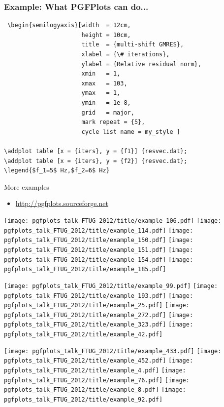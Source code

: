 \documentclass{beamer}
\begin{document}
\begin{frame}[fragile]
\frametitle{Example: What PGFPlots can do...}
\begin{verbatim}
 \begin{semilogyaxis}[width  = 12cm, 
                      height = 10cm,
                      title  = {multi-shift GMRES},
                      xlabel = {\# iterations},
                      ylabel = {Relative residual norm},
                      xmin   = 1,
                      xmax   = 103,
                      ymax   = 1,
                      ymin   = 1e-8,
                      grid   = major,
                      mark repeat = {5},
                      cycle list name = my_style ] 
                     
\addplot table [x = {iters}, y = {f1}] {resvec.dat};
\addplot table [x = {iters}, y = {f2}] {resvec.dat};
\legend{$f_1=5$ Hz,$f_2=6$ Hz} 
\end{verbatim}
\end{frame}

\begin{frame}{More examples}
    \begin{itemize}
        \item \url{http://pgfplots.sourceforge.net}
     \end{itemize}
 \texttt{[image: pgfplots\_talk\_FTUG\_2012/title/example\_106.pdf]} 
 \texttt{[image: pgfplots\_talk\_FTUG\_2012/title/example\_114.pdf]} 
 \texttt{[image: pgfplots\_talk\_FTUG\_2012/title/example\_150.pdf]} 
 \texttt{[image: pgfplots\_talk\_FTUG\_2012/title/example\_151.pdf]} 
 \texttt{[image: pgfplots\_talk\_FTUG\_2012/title/example\_154.pdf]} 
 \texttt{[image: pgfplots\_talk\_FTUG\_2012/title/example\_185.pdf]}

 \texttt{[image: pgfplots\_talk\_FTUG\_2012/title/example\_99.pdf]}
 \texttt{[image: pgfplots\_talk\_FTUG\_2012/title/example\_193.pdf]} 
 \texttt{[image: pgfplots\_talk\_FTUG\_2012/title/example\_25.pdf]} 
 \texttt{[image: pgfplots\_talk\_FTUG\_2012/title/example\_272.pdf]} 
 \texttt{[image: pgfplots\_talk\_FTUG\_2012/title/example\_323.pdf]} 
 \texttt{[image: pgfplots\_talk\_FTUG\_2012/title/example\_42.pdf]} 

 \texttt{[image: pgfplots\_talk\_FTUG\_2012/title/example\_433.pdf]} 
 \texttt{[image: pgfplots\_talk\_FTUG\_2012/title/example\_452.pdf]} 
 \texttt{[image: pgfplots\_talk\_FTUG\_2012/title/example\_4.pdf]} 
 \texttt{[image: pgfplots\_talk\_FTUG\_2012/title/example\_76.pdf]} 
 \texttt{[image: pgfplots\_talk\_FTUG\_2012/title/example\_8.pdf]} 
 \texttt{[image: pgfplots\_talk\_FTUG\_2012/title/example\_92.pdf]} 
\end{frame}
\end{document}

